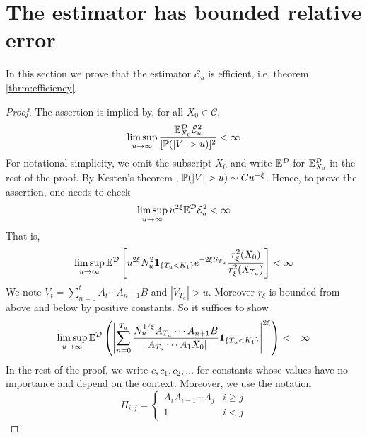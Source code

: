\section{The estimator has bounded relative error}
\label{sec:efficiency}
In this section we prove that the estimator $\mathcal E_u$ is
efficient, i.e. theorem \ref{thrm:efficiency}.
\begin{proof}\setcounter{case}{0}
  The assertion is implied by, for all $X_0 \in \mathcal C$,
  \[
  \limsup_{u \to \infty} {\E^{\mathcal D}_{X_0} \mathcal E_u^2 \over [\P(|V|
    > u)]^2} < \infty
  \]
  For notational simplicity, we omit the subscript $X_0$ and write
  $\E^{\mathcal D}$ for $\E^{\mathcal D}_{X_0}$ in the rest of the proof.
  By Kesten's theorem \cite{kesten:1973},
  $\P(|V| > u) \sim C u^{-\xi}$.
  Hence, to prove the assertion, one needs to check
  \[
  \limsup_{u \to \infty} u^{2\xi}\E^{\mathcal D} \mathcal E_u^2
  <
  \infty
  \]
That is,
  \[
  \limsup_{u \to \infty} \E^{\mathcal D}
  \left[
    u^{2\xi}
    N_u^2 \1{T_u < K_1} e^{-2\xi S_{T_u}} {r_\xi^2(X_0)
      \over r_\xi^2(X_{T_u})}
  \right] < \infty
  \]
  We note $V_t = \sum_{n=0}^t A_{t} \cdots A_{n+1} B$ and
  $|V_{T_u}| > u$. Moreover $r_\xi$ is bounded
  from above and below by positive constants. So it suffices to show
  \begin{eqnarray}
    \limsup_{u \to \infty} \E^{\mathcal D} \left(
      \left|
        \sum_{n=0}^{T_u}
        \frac{
          N_u^{1/\xi} A_{T_u} \cdots A_{n+1} B 
        }{
          |A_{T_u} \cdots A_1 X_0|
        }
        \1{T_u < K_1}
      \right|^{2 \xi}
    \right) &<& \infty \label{eq:efficiency_target}
  \end{eqnarray}
  In the rest of the proof, we write $c, c_1, c_2, \dots$ for
  constants whose values have no importance and depend on the
  context. Moreover, we use the notation
  \[
  \Pi_{i,j} = \left\{
    \begin{array}{ll}
      A_i A_{i-1} \cdots A_j & i \geq j \\
      1 & i < j
    \end{array}
  \right.
  \]


\end{proof}
